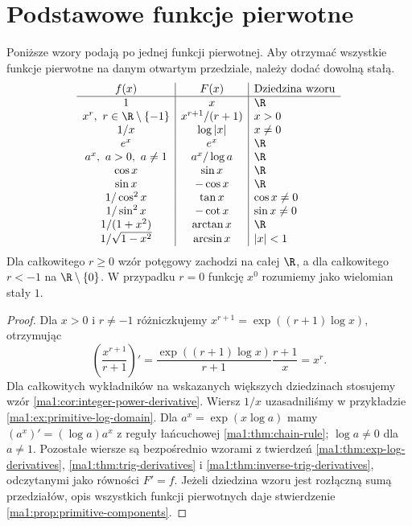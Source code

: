 \section{Podstawowe funkcje pierwotne}
\begin{stwierdzenie}
\label{ma1:prop:primitive-table}
Poniższe wzory podają po jednej funkcji pierwotnej. Aby otrzymać wszystkie funkcje pierwotne na danym otwartym przedziale, należy dodać dowolną stałą.
\[
\begin{array}{c|c|l}
 f(x)&F(x)&\text{Dziedzina wzoru}\\ \hline
 1 & x & \R\\
 x^r,\ r\in\R\setminus\{-1\} & x^{r+1}/(r+1)& x>0\\
 1/x & \log|x| & x\ne0\\
 e^x & e^x & \R\\
 a^x,\ a>0,\ a\ne1 & a^x/\log a & \R\\
 \cos x & \sin x & \R\\
 \sin x & -\cos x & \R\\
 1/\cos^2 x & \tan x & \cos x\ne0\\
 1/\sin^2 x & -\cot x & \sin x\ne0\\
 1/(1+x^2) & \arctan x & \R\\
 1/\sqrt{1-x^2} & \arcsin x & |x|<1
\end{array}
\]
Dla całkowitego $r\ge0$ wzór potęgowy zachodzi na całej $\R$, a dla całkowitego $r<-1$ na $\R\setminus\{0\}$. W przypadku $r=0$ funkcję $x^0$ rozumiemy jako wielomian stały $1$.
\end{stwierdzenie}
\begin{proof}
Dla $x>0$ i $r\ne-1$ różniczkujemy $x^{r+1}=\exp((r+1)\log x)$, otrzymując
\[
 \left(\frac{x^{r+1}}{r+1}\right)'
 =\frac{\exp((r+1)\log x)}{r+1}\frac{r+1}{x}
 =x^r.
\]
Dla całkowitych wykładników na wskazanych większych dziedzinach stosujemy wzór \ref{ma1:cor:integer-power-derivative}. Wiersz $1/x$ uzasadniliśmy w przykładzie \ref{ma1:ex:primitive-log-domain}. Dla $a^x=\exp(x\log a)$ mamy $(a^x)'=(\log a)a^x$ z reguły łańcuchowej \ref{ma1:thm:chain-rule}; $\log a\ne0$ dla $a\ne1$. Pozostałe wiersze są bezpośrednio wzorami z twierdzeń \ref{ma1:thm:exp-log-derivatives}, \ref{ma1:thm:trig-derivatives} i \ref{ma1:thm:inverse-trig-derivatives}, odczytanymi jako równości $F'=f$. Jeżeli dziedzina wzoru jest rozłączną sumą przedziałów, opis wszystkich funkcji pierwotnych daje stwierdzenie \ref{ma1:prop:primitive-components}.
\end{proof}

